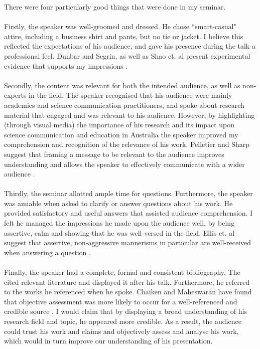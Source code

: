 There were four particularly good things that were done in my seminar.\\
\\
Firstly, the speaker was well-groomed and dressed.
He chose ``smart-casual" attire, including a business shirt and pants, but no tie or jacket.
I believe this reflected the expectations of his audience, and gave his presence during the talk a
professional feel.
Dunbar and Segrin, as well as Shao et. al present experimental evidence that supports my impressions
\cite{shao2004effects, dunbar2012clothing}.\\
\\
Secondly, the content was relevant for both the intended audience, as well as non-experts in the
field.
The speaker recognised that his audience were mainly academics and science communication
practitioners, and spoke about research material that engaged and was relevant to his audience.
However, by highlighting (through visual media) the importance of his research and its impact upon
science communication and education in Australia the speaker improved my comprehension and
recognition of the relevance of his work.
Pelletier and Sharp suggest that framing a message to be relevant to the audience improves
understanding and allows the speaker to effectively communicate with a wider audience \cite{pelletier2008persuasive}.\\
\\
Thirdly, the seminar allotted ample time for questions.
Furthermore, the speaker was amiable when asked to clarify or answer questions about his work.
He provided satisfactory and useful answers that assisted audience comprehension.
I felt he managed the impressions he made upon the audience well, by being assertive, calm and
showing that he was well-versed in the field.
Ellis et. al suggest that assertive, non-aggressive mannerisms in particular are well-received when
answering a question \cite{ellis2002use}.\\
\\
Finally, the speaker had a complete, formal and consistent bibliography.
The cited relevant literature and displayed it after his talk.
Furthermore, he referred to the works he referenced when he spoke.
Chaiken and Maheswaran have found that objective assessment was more likely to occur for a
well-referenced and credible source \cite{chaiken1994heuristic}.
I would claim that by displaying a broad understanding of his research field
and topic, he appeared more credible.
As a result, the audience could trust his work and claims and objectively assess and analyse his
work, which would in turn improve our understanding of his presentation.

